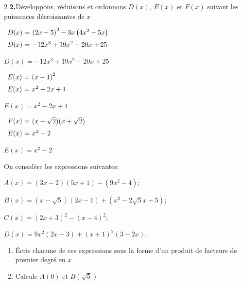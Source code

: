 \begin{multicols*}{2}
  	\textbf{2.}Développons, réduisons et ordonnons $D(x)$, $E(x)$ et $F(x)$ suivant les puissances décroissantes de $x$
  	
  	$\begin{array}{r@{\ =\ }l} \vspace{0.2cm}
  		D(x) & \left(2x-5\right)^2-3x\left(4x^2-5x\right)\\
  		
  		D(x)	&-12x^3+19x^2-20x+25\\	
  	\end{array}$
  	
  	\underline{\underline{$D(x)	=-12x^3+19x^2-20x+25$}}
  	
  	$\begin{array}{r@{\ =\ }l} \vspace{0.2cm}
  		E(x)& \left(x-1\right)^2\\
  		
  		E(x)	&x^2-2x+1\\	
  	\end{array}$
  	
  	\underline{\underline{$E(x)	=x^2-2x+1$}}
  	
  	$\begin{array}{r@{\ =\ }l} \vspace{0.2cm}
  		F(x)& (x-\sqrt{2})(x+\sqrt{2})\\
  		
  		E(x)	&x^2-2\\	
  	\end{array}$
  	
  	\underline{\underline{$E(x)	=x^2-2$}}
  	
  	
  	On considère les expressions suivantes:
  	
  	$A(x)=(3x-2)(5x+1)-(9x^2-4)$;
  	
  	$B(x)=(x-\sqrt{5})(2x-1)+(x^2-2\sqrt{5}x+5)$;
  	
  	$C(x)= (2x+3)^2-(x-4)^2$;
  	
  	$D(x)= 9x^2(2x-3)+(x+1)^2(3-2x)$.
  	\begin{enumerate}
  		\item Écris chacune de ces expressions sous la forme d'un produit de facteurs de premier degré en $x$
  		\item Calcule $A(0)$ et $B(\sqrt{5})$ 
  	\end{enumerate}
  	

\end{multicols*}
